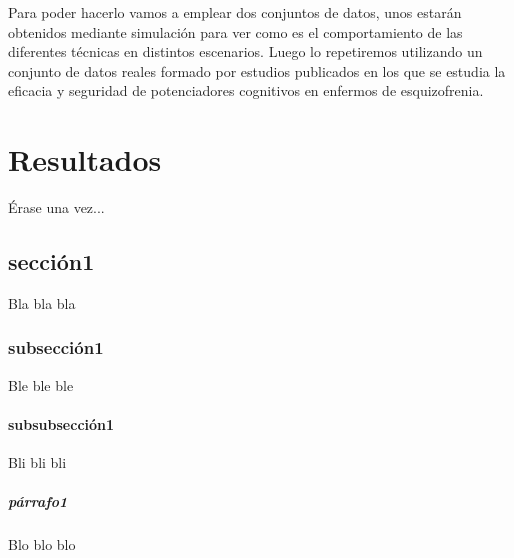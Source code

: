 \documentclass[a4paper,openright,12pt]{report}
\begin{document}
Para poder hacerlo vamos a emplear dos conjuntos de datos, unos estarán obtenidos mediante simulación para ver como es el comportamiento de las diferentes técnicas en distintos escenarios. Luego lo repetiremos utilizando un conjunto de datos reales formado por estudios publicados en los que se estudia la eficacia y seguridad de potenciadores cognitivos en enfermos de esquizofrenia.






\chapter{Resultados}\label{cap.resultados}
Érase una vez...
\section{sección1}
Bla bla bla
\subsection{subsección1}
Ble ble ble
\subsubsection{subsubsección1}
Bli bli bli
\paragraph{párrafo1}
Blo blo blo
\end{document}
